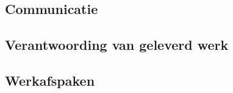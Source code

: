 \documentclass{uva-inf-article}
\begin{document}
\subsection{Communicatie}
\lipsum[37]

\subsection{Verantwoording van geleverd werk}
\lipsum[38]

\subsection{Werkafspaken}
\lipsum[39]


%


\end{document}
